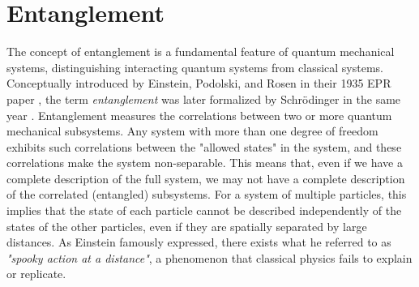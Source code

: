 \documentclass{subfiles}
\begin{document}
\section{Entanglement}
The concept of entanglement is a fundamental feature of quantum mechanical systems, distinguishing interacting quantum systems from classical systems. Conceptually introduced by Einstein, Podolski, and Rosen in their 1935 EPR paper \cite{EPR_1935}, the term \emph{entanglement} was later formalized by Schrödinger in the same year \cite{Schrödinger_1935}. Entanglement measures the correlations between two or more quantum mechanical subsystems. Any system with more than one degree of freedom exhibits such correlations between the "allowed states" in the system, and these correlations make the system non-separable. This means that, even if we have a complete description of the full system, we may not have a complete description of the correlated (entangled) subsystems. For a system of multiple particles, this implies that the state of each particle cannot be described independently of the states of the other particles, even if they are spatially separated by large distances. As Einstein famously expressed, there exists what he referred to as \emph{"spooky action at a distance"}, a phenomenon that classical physics fails to explain or replicate.
\end{document}
